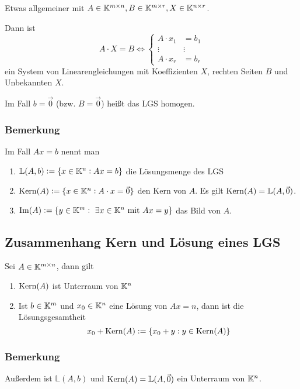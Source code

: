 Etwas allgemeiner mit $A \in \mathbb{K}^{m \times n}, B \in \mathbb{K}^{m \times r},
X \in \mathbb{K}^{n \times r}$.

Dann ist
\begin{equation*}
    A \cdot X = B \Leftrightarrow
    \begin{cases}
        A \cdot x_1 & = b_1\\
        \vdots & \vdots \\
        A \cdot x_r & = b_r
    \end{cases}
\end{equation*}
ein System von Linearengleichungen mit Koeffizienten $X$, rechten Seiten $B$
und Unbekannten $X$.

Im Fall $b=\vec{0}$ (bzw. $B = \vec{0}$) heißt das LGS homogen.

\subsubsection{Bemerkung}
Im Fall $A x = b$ nennt man
\begin{enumerate}[label= (\alph*)]
    \item $\mathbb{L}(A, b) := \{ x \in \mathbb{K}^n: A x = b \}$ die Lösungsmenge des
        LGS
    \item $\operatorname{Kern}(A) := \{ x \in \mathbb{K}^n: A \cdot x = \vec{0}\}$ den Kern von $A$.
        Es gilt $\operatorname{Kern}(A) = \mathbb{L}(A,\vec{0})$.
    \item $\operatorname{Im}(A) := \{ y \in \mathbb{K}^m:\ \exists x \in \mathbb{K}^n \text{ mit } A x = y\}$
        das Bild von $A$.
\end{enumerate}

\subsection{Zusammenhang Kern und Lösung eines LGS}
Sei $A \in \mathbb{K}^{m \times n}$, dann gilt
\begin{enumerate}[label= (\alph*)]
    \item $\operatorname{Kern}(A)$ ist Unterraum von $\mathbb{K}^n$
    \item Ist $b \in \mathbb{K}^m$ und $x_0 \in \mathbb{K}^n$ eine Lösung von $Ax=n$, dann ist
        die Lösungsgesamtheit
        \begin{equation*}
            x_0 + \operatorname{Kern}(A) := \{ x_0 + y: y \in \operatorname{Kern}(A) \}
        \end{equation*}
\end{enumerate}

\subsubsection{Bemerkung}
Außerdem ist $\mathbb{L}(A,b)$ und $\operatorname{Kern}(A) = \mathbb{L}(A,\vec{0})$
ein Unterraum von $\mathbb{K}^n$.

